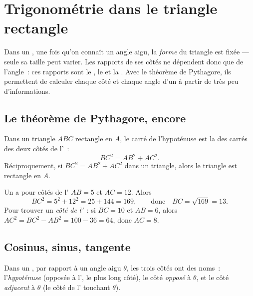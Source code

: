 \chapter{Trigonométrie dans le triangle rectangle}\label{ch:g9:trig}

Dans un , une fois qu'on connaît un angle aigu, la
\emph{forme} du triangle est fixée --- seule sa taille peut varier. Les
rapports de ses côtés ne dépendent donc que de l'angle~: ces rapports
sont le , le  et la . Avec le théorème de Pythagore,
ils permettent de calculer chaque côté et chaque angle d'un  à partir de très peu d'informations.

\section{Le théorème de Pythagore, encore}

\begin{theorem}[Pythagore]\label{thm:g9:trig:pythagoras}
Dans un triangle $ABC$ rectangle en $A$, le carré de l'hypoténuse est la
 des carrés des deux côtés de l'~:
\[
BC^2 = AB^2 + AC^2 .
\]
Réciproquement, si $BC^2 = AB^2 + AC^2$ dans un triangle, alors le
triangle est rectangle en $A$.
\end{theorem}
\admitted

\begin{example}\label{ex:g9:trig:pythagoras}
Un  a pour côtés de l' $AB = 5$ et
$AC = 12$. Alors
\[
BC^2 = 5^2 + 12^2 = 25 + 144 = 169,
\qquad\text{donc}\quad BC = \sqrt{169} = 13 .
\]
Pour trouver un \emph{côté de l'}~: si $BC = 10$ et
$AB = 6$, alors $AC^2 = BC^2 - AB^2 = 100 - 36 = 64$, donc $AC = 8$.
\end{example}

\section{Cosinus, sinus, tangente}

Dans un , par rapport à un angle aigu $\theta$, les
trois côtés ont des noms~: l'\emph{hypoténuse} (opposée à l',
le plus long côté), le côté \emph{opposé} à $\theta$, et le côté
\emph{adjacent} à $\theta$ (le côté de l' touchant $\theta$).

